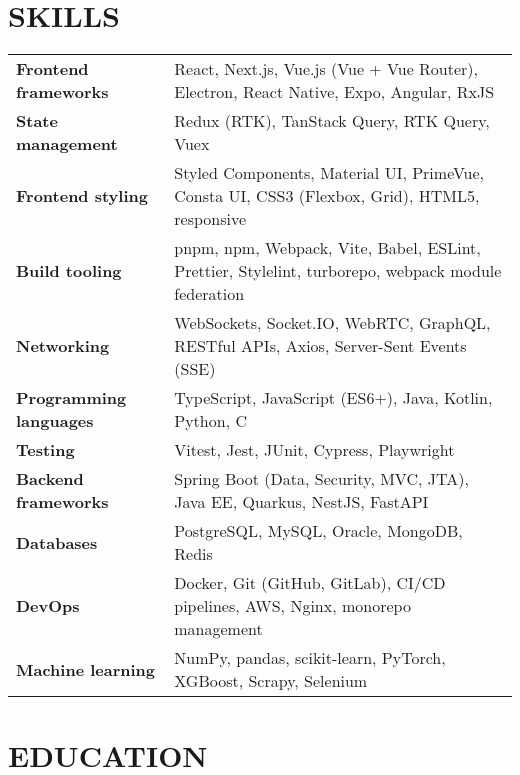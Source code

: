 \documentclass[11pt,a4paper]{moderncv}
\begin{document}
\section{SKILLS}
{\renewcommand{\arraystretch}{1.1}
\setlength{\tabcolsep}{4pt}
\begin{tabularx}{\linewidth}{@{}>{\bfseries}l >{}X@{}}

Frontend frameworks & React, Next.js, Vue.js (Vue + Vue Router), Electron, React Native, Expo, Angular, RxJS \\ [0.4em]

State management & Redux (RTK), TanStack Query, RTK Query, Vuex \\ [0.4em]

Frontend styling & Styled Components, Material UI, PrimeVue, Consta UI, CSS3 (Flexbox, Grid), HTML5, responsive \\ [0.4em]

Build tooling & pnpm, npm, Webpack, Vite, Babel, ESLint, Prettier, Stylelint, turborepo, webpack module federation \\ [0.4em]

Networking & WebSockets, Socket.IO, WebRTC, GraphQL, RESTful APIs, Axios, Server-Sent Events (SSE) \\ [0.4em]

Programming languages & TypeScript, JavaScript (ES6+), Java, Kotlin, Python, C \\ [0.4em]

Testing & Vitest, Jest, JUnit, Cypress, Playwright \\ [0.4em]

Backend frameworks & Spring Boot (Data, Security, MVC, JTA), Java EE, Quarkus, NestJS, FastAPI \\ [0.4em]

Databases & PostgreSQL, MySQL, Oracle, MongoDB, Redis \\ [0.4em]

DevOps & Docker, Git (GitHub, GitLab), CI/CD pipelines, AWS, Nginx, monorepo management \\ [0.4em]

Machine learning & NumPy, pandas, scikit-learn, PyTorch, XGBoost, Scrapy, Selenium \\

\end{tabularx}
}
\section{EDUCATION}
\vspace{0.5em}
\newlength{\EduGap}
\setlength{\EduGap}{4mm} %
\end{document}

